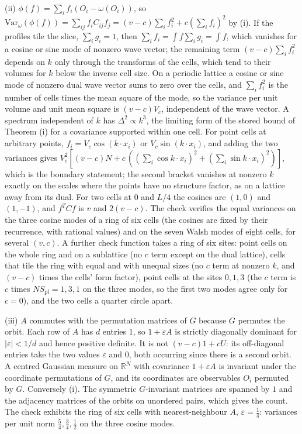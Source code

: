 (ii) $\phi(f) = \sum_{i}f_{i}(O_{i} - \omega(O_{i}))$, so $\mathrm{Var}_{\omega}(\phi(f)) = \sum_{ij}f_{i}C_{ij}f_{j} = (v - c)\sum_{i}f_{i}^{2} + c(\sum_{i}f_{i})^{2}$ by (i). If the profiles tile the slice, $\sum_{i}g_{i} = 1$, then $\sum_{i}f_{i} = \int f\sum_{i}g_{i} = \int f$, which vanishes for a cosine or sine mode of nonzero wave vector; the remaining term $(v - c)\sum_{i}f_{i}^{2}$ depends on $k$ only through the transforms of the cells, which tend to their volumes for $k$ below the inverse cell size. On a periodic lattice a cosine or sine mode of nonzero dual wave vector sums to zero over the cells, and $\sum_{i}f_{i}^{2}$ is the number of cells times the mean square of the mode, so the variance per unit volume and unit mean square is $(v - c)V_{c}$, independent of the wave vector. A spectrum independent of $k$ has $\Delta^{2} \propto k^{3}$, the limiting form of the stored bound of Theorem (i) for a covariance supported within one cell. For point cells at arbitrary points, $f_{i} = V_{c}\cos(k\cdot x_{i})$ or $V_{c}\sin(k\cdot x_{i})$, and adding the two variances gives $V_{c}^{2}[(v - c)N + c\,((\sum_{i}\cos k\cdot x_{i})^{2} + (\sum_{i}\sin k\cdot x_{i})^{2})]$, which is the boundary statement; the second bracket vanishes at nonzero $k$ exactly on the scales where the points have no structure factor, as on a lattice away from its dual. For two cells at $0$ and $L/4$ the cosines are $(1, 0)$ and $(1, -1)$, and $f^{T}Cf$ is $v$ and $2(v - c)$. The check verifies the equal variances on the three cosine modes of a ring of six cells (the cosines are fixed by their recurrence, with rational values) and on the seven Walsh modes of eight cells, for several $(v, c)$. A further check function takes a ring of six sites: point cells on the whole ring and on a sublattice (no $c$ term except on the dual lattice), cells that tile the ring with equal and with unequal sizes (no $c$ term at nonzero $k$, and $(v - c)$ times the cells' form factor), point cells at the sites $0, 1, 3$ (the $c$ term is $c$ times $N S_{\mathrm{pl}} = 1, 3, 1$ on the three modes, so the first two modes agree only for $c = 0$), and the two cells a quarter circle apart.

(iii) $A$ commutes with the permutation matrices of $G$ because $G$ permutes the orbit. Each row of $A$ has $d$ entries $1$, so $1 + \varepsilon A$ is strictly diagonally dominant for $|\varepsilon| < 1/d$ and hence positive definite. It is not $(v - c)1 + cU$: its off-diagonal entries take the two values $\varepsilon$ and $0$, both occurring since there is a second orbit. A centred Gaussian measure on $\mathbb{R}^{N}$ with covariance $1 + \varepsilon A$ is invariant under the coordinate permutations of $G$, and its coordinates are observables $O_{i}$ permuted by $G$. Conversely (i). The symmetric $G$-invariant matrices are spanned by $1$ and the adjacency matrices of the orbits on unordered pairs, which gives the count. The check exhibits the ring of six cells with nearest-neighbour $A$, $\varepsilon = \tfrac14$: variances per unit norm $\tfrac54, \tfrac34, \tfrac12$ on the three cosine modes.

